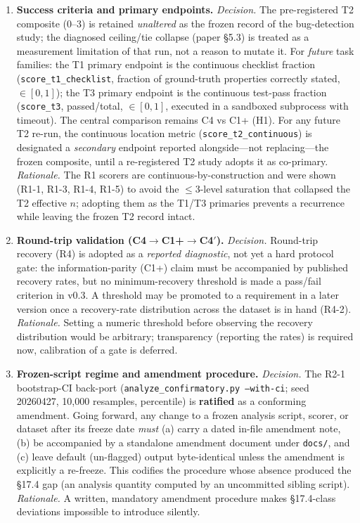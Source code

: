 \documentclass[11pt]{article}
\begin{document}
\begin{enumerate}
  \item \textbf{Success criteria and primary endpoints.}
    \emph{Decision.} The pre-registered T2 composite (0--3) is retained
    \emph{unaltered} as the frozen record of the bug-detection study; the
    diagnosed ceiling/tie collapse (paper \S5.3) is treated as a measurement
    limitation of that run, not a reason to mutate it. For \emph{future}
    task families: the T1 primary endpoint is the continuous checklist
    fraction (\texttt{score\_t1\_checklist}, fraction of ground-truth
    properties correctly stated, $\in[0,1]$); the T3 primary endpoint is the
    continuous test-pass fraction (\texttt{score\_t3}, passed/total, $\in[0,1]$,
    executed in a sandboxed subprocess with timeout). The central comparison
    remains C4 vs C1+ (H1). For any future T2 re-run, the continuous
    location metric (\texttt{score\_t2\_continuous}) is designated a
    \emph{secondary} endpoint reported alongside---not replacing---the frozen
    composite, until a re-registered T2 study adopts it as co-primary.
    \emph{Rationale.} The R1 scorers are continuous-by-construction and were
    shown (R1-1, R1-3, R1-4, R1-5) to avoid the $\le 3$-level saturation that
    collapsed the T2 effective $n$; adopting them as the T1/T3 primaries
    prevents a recurrence while leaving the frozen T2 record intact.

  \item \textbf{Round-trip validation (C4$\to$C1+$\to$C4$'$).}
    \emph{Decision.} Round-trip recovery (R4) is adopted as a
    \emph{reported diagnostic}, not yet a hard protocol gate: the
    information-parity (C1+) claim must be accompanied by published recovery
    rates, but no minimum-recovery threshold is made a pass/fail criterion in
    v0.3. A threshold may be promoted to a requirement in a later version once
    a recovery-rate distribution across the dataset is in hand (R4-2).
    \emph{Rationale.} Setting a numeric threshold before observing the
    recovery distribution would be arbitrary; transparency (reporting the
    rates) is required now, calibration of a gate is deferred.

  \item \textbf{Frozen-script regime and amendment procedure.}
    \emph{Decision.} The R2-1 bootstrap-CI back-port
    (\texttt{analyze\_confirmatory.py --with-ci}; seed 20260427, 10{,}000
    resamples, percentile) is \textbf{ratified} as a conforming amendment.
    Going forward, any change to a frozen analysis script, scorer, or dataset
    after its freeze date \emph{must} (a) carry a dated in-file amendment note,
    (b) be accompanied by a standalone amendment document under \texttt{docs/},
    and (c) leave default (un-flagged) output byte-identical unless the
    amendment is explicitly a re-freeze. This codifies the procedure whose
    absence produced the \S17.4 gap (an analysis quantity computed by an
    uncommitted sibling script).
    \emph{Rationale.} A written, mandatory amendment procedure makes
    \S17.4-class deviations impossible to introduce silently.


\end{enumerate}
\end{document}
